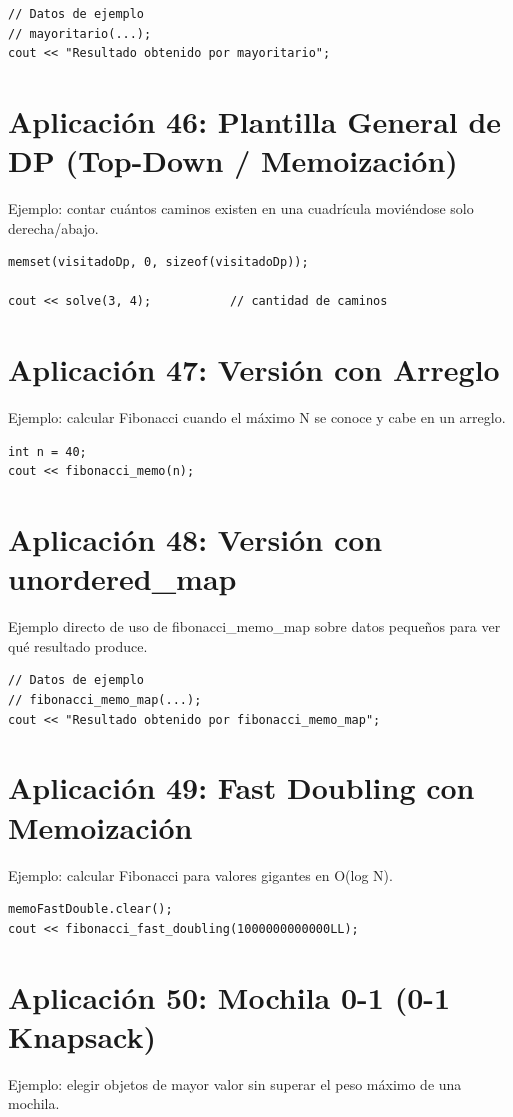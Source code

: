 \documentclass[10pt,twocolumn,letterpaper]{report}
\begin{document}
\begin{lstlisting}
// Datos de ejemplo
// mayoritario(...);
cout << "Resultado obtenido por mayoritario";
\end{lstlisting}

\section{Aplicación 46: Plantilla General de DP (Top-Down / Memoización)}
Ejemplo: contar cuántos caminos existen en una cuadrícula moviéndose solo derecha/abajo.

\begin{lstlisting}
memset(visitadoDp, 0, sizeof(visitadoDp));

cout << solve(3, 4);           // cantidad de caminos
\end{lstlisting}

\section{Aplicación 47: Versión con Arreglo}
Ejemplo: calcular Fibonacci cuando el máximo N se conoce y cabe en un arreglo.

\begin{lstlisting}
int n = 40;
cout << fibonacci_memo(n);
\end{lstlisting}

\section{Aplicación 48: Versión con unordered\_map}
Ejemplo directo de uso de fibonacci\_memo\_map sobre datos pequeños para ver qué resultado produce.

\begin{lstlisting}
// Datos de ejemplo
// fibonacci_memo_map(...);
cout << "Resultado obtenido por fibonacci_memo_map";
\end{lstlisting}

\section{Aplicación 49: Fast Doubling con Memoización}
Ejemplo: calcular Fibonacci para valores gigantes en O(log N).

\begin{lstlisting}
memoFastDouble.clear();
cout << fibonacci_fast_doubling(1000000000000LL);
\end{lstlisting}

\section{Aplicación 50: Mochila 0-1 (0-1 Knapsack)}
Ejemplo: elegir objetos de mayor valor sin superar el peso máximo de una mochila.
\end{document}
